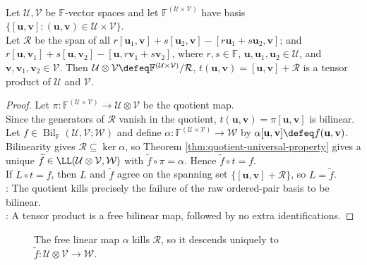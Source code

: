 \begin{theorem} \label{thm:tensor-product-quotient-construction} \\
Let $\mathcal{U},\mathcal{V}$ be $\mathbb{F}$-vector spaces and let $\mathbb{F}^{(\mathcal{U}\times\mathcal{V})}$ have basis $\{[\mathbf{u},\mathbf{v}]:(\mathbf{u},\mathbf{v})\in\mathcal{U}\times\mathcal{V}\}$.\\
Let $\mathcal{R}$ be the span of all $r[\mathbf{u}_1,\mathbf{v}]+s[\mathbf{u}_2,\mathbf{v}]-[r\mathbf{u}_1+s\mathbf{u}_2,\mathbf{v}]$; and $r[\mathbf{u},\mathbf{v}_1]+s[\mathbf{u},\mathbf{v}_2]-[\mathbf{u},r\mathbf{v}_1+s\mathbf{v}_2]$, where $r,s\in\mathbb{F}$, $\mathbf{u},\mathbf{u}_1,\mathbf{u}_2\in\mathcal{U}$, and $\mathbf{v},\mathbf{v}_1,\mathbf{v}_2\in\mathcal{V}$. Then $\mathcal{U}\otimes\mathcal{V}\defeq \mathbb{F}^{(\mathcal{U}\times\mathcal{V})}/\mathcal{R}$, $t(\mathbf{u},\mathbf{v})=[\mathbf{u},\mathbf{v}]+\mathcal{R}$ is a tensor product of $\mathcal{U}$ and $\mathcal{V}$.
\begin{proof} Let $\pi:\mathbb{F}^{(\mathcal{U}\times\mathcal{V})}\to\mathcal{U}\otimes\mathcal{V}$ be the quotient map.\\
Since the generators of $\mathcal{R}$ vanish in the quotient, $t(\mathbf{u},\mathbf{v})=\pi[\mathbf{u},\mathbf{v}]$ is bilinear.\\
Let $f\in\operatorname{Bil}_{\mathbb{F}}(\mathcal{U},\mathcal{V};\mathcal{W})$ and define $\alpha:\mathbb{F}^{(\mathcal{U}\times\mathcal{V})}\to\mathcal{W}$ by $\alpha[\mathbf{u},\mathbf{v}]\defeq f(\mathbf{u},\mathbf{v})$.\\
Bilinearity gives $\mathcal{R}\subseteq\ker\alpha$, so Theorem \ref{thm:quotient-universal-property} gives a unique $\widetilde{f}\in\LL(\mathcal{U}\otimes\mathcal{V},\mathcal{W})$ with $\widetilde{f}\circ \pi=\alpha$. Hence $\widetilde{f}\circ t=f$.\\
If $L\circ t=f$, then $L$ and $\widetilde{f}$ agree on the spanning set $\{[\mathbf{u},\mathbf{v}]+\mathcal{R}\}$, so $L=\widetilde{f}$.\\
: The quotient kills precisely the failure of the raw ordered-pair basis to be bilinear.\\
: A tensor product is a free bilinear map, followed by no extra identifications.
\end{proof}
\end{theorem}

\begin{figure}[H]
  \centering
  
  \caption{The free linear map $\alpha$ kills $\mathcal{R}$, so it descends
  uniquely to $\widetilde{f}:\mathcal{U}\otimes\mathcal{V}\to\mathcal{W}$.}
  \label{fig:tensor-quotient-construction-universal}
\end{figure}

